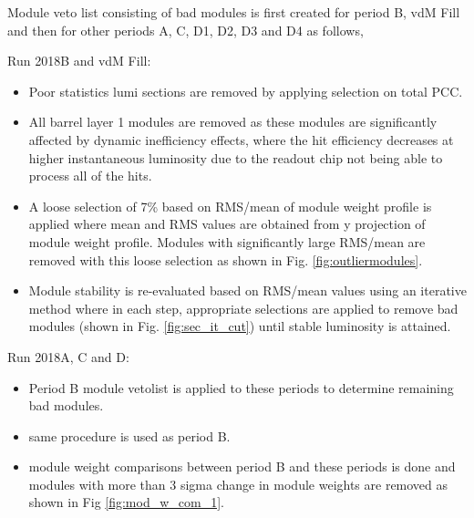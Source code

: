 
Module veto list consisting of bad modules is first created for period B, vdM Fill and then for other periods A, C, D1, D2, D3 and D4 as follows, 

Run 2018B and vdM Fill:
\begin{itemize}

\item Poor statistics lumi sections are removed by applying selection on total PCC. %

\item All barrel layer 1 modules are removed as these modules are significantly affected by dynamic inefficiency effects, where the hit efficiency decreases at higher instantaneous luminosity due to the readout chip not being able to process all of the hits.
  
\item A loose selection of 7\% based on RMS/mean of module weight profile is applied where mean and RMS values are obtained from y projection of module weight profile. Modules with significantly large RMS/mean are removed with this loose selection as shown in Fig. \ref{fig:outliermodules}. 

\item Module stability is re-evaluated based on RMS/mean values using an iterative method where in each step, appropriate selections are applied to remove bad modules (shown in Fig. \ref{fig:sec_it_cut}) until stable luminosity is attained.                                                      
\end{itemize}

Run 2018A, C and D:                                                                      
\begin{itemize}  

\item Period B module vetolist is applied to these periods to determine remaining bad modules.

\item same procedure is used as period B. 

\item module weight comparisons between period B and these periods is done and modules with more than 3 sigma change in module weights are removed as shown in %
  Fig \ref{fig:mod_w_com_1}.                                                                              
\end{itemize}

